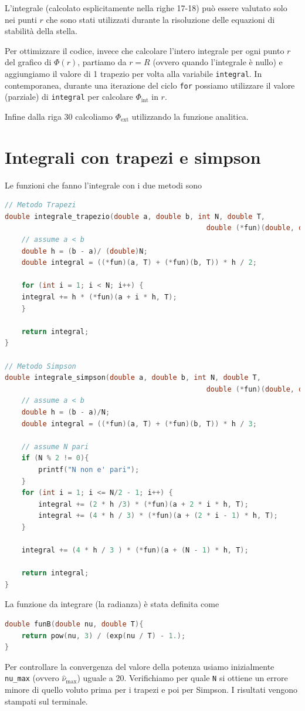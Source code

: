 \documentclass[a4paper, titlepage]{article}
\begin{document}
L'integrale (calcolato esplicitamente nella righe 17-18) può essere valutato
solo nei punti $r$ che sono stati utilizzati durante la risoluzione delle
equazioni di stabilità della stella.

Per ottimizzare il codice, invece che calcolare l'intero integrale per ogni
punto $r$ del grafico di $\Phi(r)$, partiamo da $r = R$ (ovvero quando
l'integrale è nullo) e aggiungiamo il valore di 1 trapezio per volta alla
variabile \texttt{integral}. In contemporanea, durante una iterazione del ciclo
\texttt{for} possiamo utilizzare il valore (parziale) di \texttt{integral} per
calcolare $\Phi_\text{int}$ in $r$.

Infine dalla riga 30 calcoliamo $\Phi_\text{ext}$ utilizzando la funzione
analitica.


\section{Integrali con trapezi e simpson} \label{ap:integrali}

Le funzioni che fanno l'integrale con i due metodi sono

\begin{lstlisting}[language=C]
// Metodo Trapezi
double integrale_trapezio(double a, double b, int N, double T,
                                                double (*fun)(double, double)){
    // assume a < b
    double h = (b - a)/ (double)N;
    double integral = ((*fun)(a, T) + (*fun)(b, T)) * h / 2;

    for (int i = 1; i < N; i++) {
    integral += h * (*fun)(a + i * h, T);
    }

    return integral;
}

// Metodo Simpson
double integrale_simpson(double a, double b, int N, double T,
                                                double (*fun)(double, double)){
    // assume a < b
    double h = (b - a)/N;
    double integral = ((*fun)(a, T) + (*fun)(b, T)) * h / 3;

    // assume N pari
    if (N % 2 != 0){
        printf("N non e' pari");
    }
    for (int i = 1; i <= N/2 - 1; i++) {
        integral += (2 * h /3) * (*fun)(a + 2 * i * h, T);
        integral += (4 * h / 3) * (*fun)(a + (2 * i - 1) * h, T);
    }

    integral += (4 * h / 3 ) * (*fun)(a + (N - 1) * h, T);

    return integral;
}
\end{lstlisting}

La funzione da integrare (la radianza) è stata definita come
\begin{lstlisting}[language=C]
double funB(double nu, double T){
    return pow(nu, 3) / (exp(nu / T) - 1.);
}
\end{lstlisting}
Per controllare la convergenza del valore della potenza usiamo inizialmente
\texttt{nu\_max} (ovvero $\hat \nu_\text{max}$) uguale a 20.
Verifichiamo per quale \texttt{N} si ottiene un errore minore di quello voluto
prima per i trapezi e poi per Simpson.
I risultati vengono stampati sul terminale.
\end{document}
